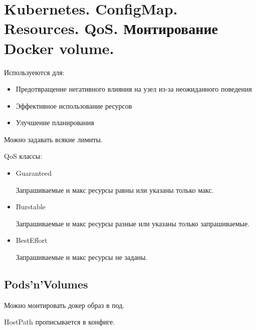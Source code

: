 \section{Kubernetes. ConfigMap. Resources. QoS. Монтирование Docker volume.}



Используеются для:
\begin{itemize}
    \item Предотвращение негативного влияния на узел из-за неожиданного поведения
    \item Эффективное использование ресурсов
    \item Улучшение планирования
\end{itemize}

Можно задавать всякие лимиты.


QoS классы:
\begin{itemize}
    \item Guaranteed
    
    Запрашиваемые и макс ресурсы равны или указаны только макс.
    \item Burstable
    
    Запрашиваемые и макс ресурсы разные или указаны только запрашиваемые.
    \item BestEffort
    
    Запрашиваемые и макс ресурсы не заданы.
\end{itemize}

\subsection*{Pods'n'Volumes}

Можно монтировать докер образ в под.

HostPath прописывается в конфиге.
